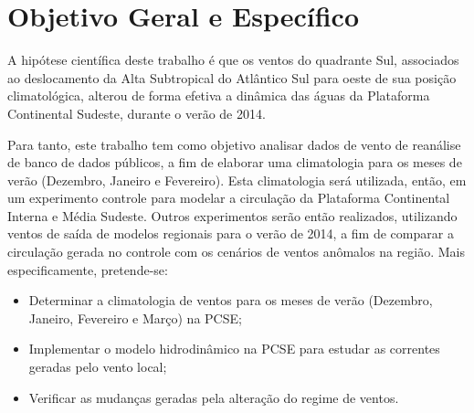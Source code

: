 


\section{Objetivo Geral e Específico}
\label{sec:objectives}

\hspace{5mm} A hipótese científica deste trabalho é que os ventos do quadrante Sul, associados
ao deslocamento da Alta Subtropical do Atlântico Sul para oeste de sua posição
climatológica, alterou de forma efetiva a dinâmica das águas da Plataforma
Continental Sudeste, durante o verão de 2014.

\hspace{5mm} Para tanto, este trabalho tem como objetivo analisar dados de vento de reanálise de banco de dados públicos, a fim de elaborar uma climatologia para os meses de verão (Dezembro, Janeiro e Fevereiro). Esta climatologia será utilizada, então, em um experimento controle para modelar a circulação da Plataforma Continental Interna e Média Sudeste. 
Outros experimentos serão então realizados, utilizando ventos de saída de modelos regionais para o verão de 2014, a fim de comparar a circulação gerada no controle com os cenários de ventos anômalos na região. Mais especificamente, pretende-se:

\begin{itemize}
    \item Determinar a climatologia de ventos para os meses de verão (Dezembro, Janeiro, Fevereiro e Março) na PCSE;
    \item Implementar o modelo hidrodinâmico na PCSE para estudar as correntes geradas pelo vento local;
    \item Verificar as mudanças geradas pela alteração do regime de ventos.
\end{itemize}
